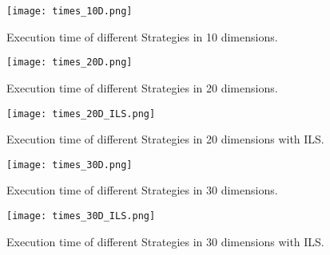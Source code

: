 \documentclass[paper=a4, fontsize=11pt]{scrartcl} %
\numberwithin{equation}{section} %
\numberwithin{figure}{section} %
\numberwithin{table}{section} %
\begin{document}
\begin{figure}[!ht]
	\texttt{[image: times\_10D.png]}
	\caption{Execution time of different Strategies in 10 dimensions.}
	\label{F_10}
\end{figure}
\begin{figure}[!ht]
	\texttt{[image: times\_20D.png]}
	\caption{Execution time of different Strategies in 20 dimensions.}
	\label{F_20}
\end{figure}
\begin{figure}[!ht]
	\texttt{[image: times\_20D\_ILS.png]}
	\caption{Execution time of different Strategies in 20 dimensions with ILS.}
	\label{F_20_ILS}
\end{figure}
\begin{figure}[!ht]
	\texttt{[image: times\_30D.png]}
	\caption{Execution time of different Strategies in 30 dimensions.}
	\label{F_30}
\end{figure}
\begin{figure}[!ht]
	\texttt{[image: times\_30D\_ILS.png]}
	\caption{Execution time of different Strategies in 30 dimensions with ILS.}
	\label{F_30_ILS}
\end{figure}



\end{document}
